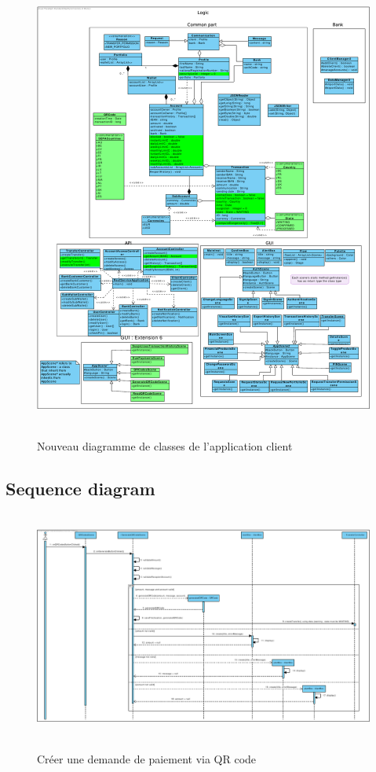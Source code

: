 \documentclass[]{report}
\begin{document}
\begin{figure}[h!]
\hspace{1.25cm}
\hbox{
	\centering\includegraphics[scale=0.6]{img/Class Client - Extension 6.pdf}
}
\caption{Nouveau diagramme de classes de l'application client}
\end{figure}

\newpage

\subsection{Sequence diagram}

\begin{figure}[h!]
\hbox{
    \centering\includegraphics[width=\linewidth]{img/Sequence 1 - Extension 6.pdf}
}
\caption{Créer une demande de paiement via QR code}
\end{figure}
\end{document}
